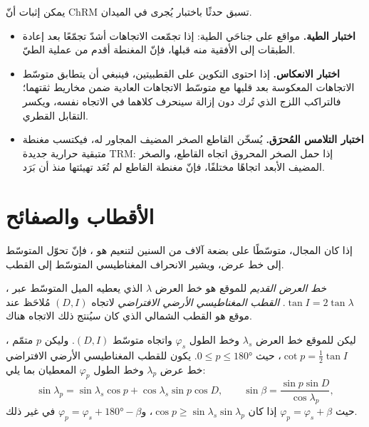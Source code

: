 \begin{method}\label{met:b3:palaeomagnetism:tests}
يمكن إثبات أنّ ChRM تسبق حدثًا باختبار يُجرى في الميدان.
\begin{itemize}
  \item \textbf{اختبار الطية.} مواقع على جناحَي الطية: إذا تجمّعت الاتجاهات
        أشدّ تجمّعًا بعد إعادة الطبقات إلى الأفقية منه قبلها،
        فإنّ المغنطة أقدم من عملية الطيّ.
  \item \textbf{اختبار الانعكاس.} إذا احتوى التكوين على القطبيتين، فينبغي أن يتطابق متوسّط
        الاتجاهات المعكوسة بعد قلبها مع
        متوسّط الاتجاهات العادية ضمن مخاريط ثقتهما؛ فالتراكب اللزج الذي تُرك
        دون إزالة سينحرف كلاهما في الاتجاه نفسه، ويكسر التقابل القطري.
  \item \textbf{اختبار التلامس المُحرَق.} يُسخّن القاطع الصخر المضيف المجاور له،
        فيكتسب مغنطة متبقية حرارية جديدة TRM: إذا حمل الصخر المحروق اتجاه القاطع،
        والصخر المضيف الأبعد اتجاهًا مختلفًا، فإنّ مغنطة القاطع
        لم تُعَد تهيئتها منذ أن بَرَد.
\end{itemize}
\end{method}

\section{الأقطاب والصفائح}

إذا كان المجال، متوسّطًا على بضعة آلاف من السنين لتنعيم  هو ، فإنّ  تحوّل
 المتوسّط إلى خط عرض، ويشير الانحراف المغناطيسي المتوسّط إلى القطب.

\begin{definition}\label{def:b3:palaeomagnetism:vgp}
\emph{خط العرض القديم} للموقع هو خط العرض
$\lambda$ الذي يعطيه الميل المتوسّط عبر ، $\tan I =
2\tan\lambda$. \emph{القطب المغناطيسي الأرضي الافتراضي}
 لاتجاه $(D, I)$ مُلاحَظ عند موقع هو القطب الشمالي
 الذي كان سيُنتج ذلك الاتجاه هناك.
\end{definition}

\begin{theorem}\label{thm:b3:palaeomagnetism:pole}
ليكن للموقع خط العرض $\lambda_s$ وخط الطول $\varphi_s$ واتجاه متوسّط
$(D, I)$. وليكن $p$ متمّم ، $\cot p = \tfrac12\tan I$،
حيث $0 \le p \le \ang{180}$. يكون للقطب المغناطيسي الأرضي الافتراضي خط عرض
$\lambda_p$ وخط الطول $\varphi_p$ المعطيان بما يلي:
\[
  \sin\lambda_p = \sin\lambda_s\cos p + \cos\lambda_s\sin p\cos D,\qquad
  \sin\beta = \frac{\sin p\sin D}{\cos\lambda_p},
\]
حيث $\varphi_p = \varphi_s + \beta$ إذا كان $\cos p \ge \sin\lambda_s\sin\lambda_p$،
و$\varphi_p = \varphi_s + \ang{180} - \beta$ في غير ذلك.
\end{theorem}

